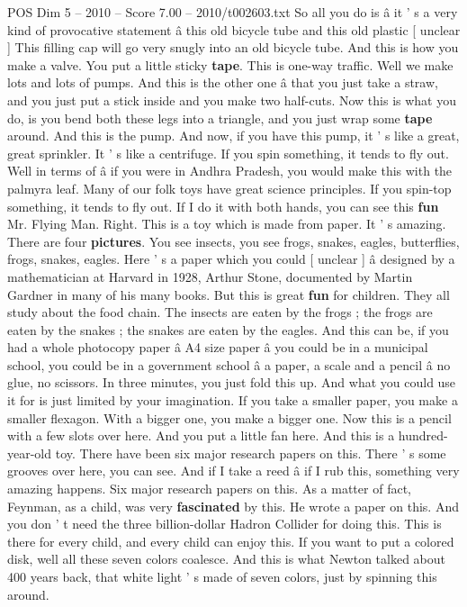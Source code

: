 \begin{textsample}{POS Dim 5 – 2010 – Score 7.00 – 2010/t002603.txt}
So all you do is â it ' s a very kind of provocative statement â this old bicycle tube and this old plastic [ unclear ] This filling cap will go very snugly into an old bicycle tube.
And this is how you make a valve.
You put a little sticky \textbf{tape}.
This is one-way traffic.
Well we make lots and lots of pumps.
And this is the other one â that you just take a straw, and you just put a stick inside and you make two half-cuts.
Now this is what you do, is you bend both these legs into a triangle, and you just wrap some \textbf{tape} around.
And this is the pump.
And now, if you have this pump, it ' s like a great, great sprinkler.
It ' s like a centrifuge.
If you spin something, it tends to fly out.
Well in terms of â if you were in Andhra Pradesh, you would make this with the palmyra leaf.
Many of our folk toys have great science principles.
If you spin-top something, it tends to fly out.
If I do it with both hands, you can see this \textbf{fun} Mr.
Flying Man.
Right.
This is a toy which is made from paper.
It ' s amazing.
There are four \textbf{pictures}.
You see insects, you see frogs, snakes, eagles, butterflies, frogs, snakes, eagles.
Here ' s a paper which you could [ unclear ] â designed by a mathematician at Harvard in 1928, Arthur Stone, documented by Martin Gardner in many of his many books.
But this is great \textbf{fun} for children.
They all study about the food chain.
The insects are eaten by the frogs ; the frogs are eaten by the snakes ; the snakes are eaten by the eagles.
And this can be, if you had a whole photocopy paper â A4 size paper â you could be in a municipal school, you could be in a government school â a paper, a scale and a pencil â no glue, no scissors.
In three minutes, you just fold this up.
And what you could use it for is just limited by your imagination.
If you take a smaller paper, you make a smaller flexagon.
With a bigger one, you make a bigger one.
Now this is a pencil with a few slots over here.
And you put a little fan here.
And this is a hundred-year-old toy.
There have been six major research papers on this.
There ' s some grooves over here, you can see.
And if I take a reed â if I rub this, something very amazing happens.
Six major research papers on this.
As a matter of fact, Feynman, as a child, was very \textbf{fascinated} by this.
He wrote a paper on this.
And you don ' t need the three billion-dollar Hadron Collider for doing this.
This is there for every child, and every child can enjoy this.
If you want to put a colored disk, well all these seven colors coalesce.
And this is what Newton talked about 400 years back, that white light ' s made of seven colors, just by spinning this around.

\end{textsample}
